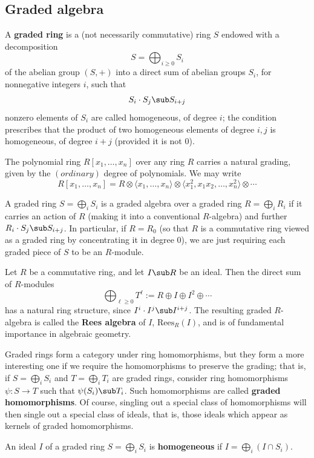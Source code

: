 \subsection{Graded algebra}
A \textbf{graded ring} is a (not necessarily commutative) ring $S$ endowed with a decomposition
\[S=\bigoplus_{i\geq 0}S_i\]
of the abelian group $(S,+)$ into a direct sum of abelian groups $S_i$, for nonnegative integers $i$, such that
\[S_i\cdot S_j\sub S_{i+j}\]
nonzero elements of $S_i$ are called homogeneous, of degree $i$; the condition prescribes that the product of two homogeneous elements of degree $i,j$ is homogeneous, of degree $i+j$ (provided it is not $0$).
\begin{example}
The polynomial ring $R[x_1,\dots,x_n]$ over any ring $R$ carries a natural grading, given by the $(ordinary)$ degree of polynomials. We may write
\[R[x_1,\dots,x_n]=R\otimes\langle x_1,\dots,x_n\rangle\otimes\langle x_1^2,x_1x_2,\dots,x_n^2\rangle\otimes\cdots\]
\end{example}
A graded ring $S=\bigoplus_iS_i$ is a graded algebra over a graded ring $R=\bigoplus_iR_i$ if it carries an action of $R$ (making it into a conventional $R$-algebra) and further $R_i\cdot S_j\sub S_{i+j}$. In particular, if $R=R_0$ (so that $R$ is a commutative ring viewed as a graded ring by concentrating it in degree $0$), we are just requiring each graded piece of $S$ to be an $R$-module. 
\begin{example}
Let $R$ be a commutative ring, and let $I\sub R$ be an ideal. Then the direct sum of $R$-modules
\[\bigoplus_{\ell\geq0}T^{\ell}:=R\oplus I\oplus I^2\oplus\cdots\]
has a natural ring structure, since $I^i\cdot I^j\sub I^{i+j}$. The resulting graded $R$-algebra is
called the \textbf{Rees algebra} of $I$, $\mathrm{Rees}_R(I)$, and is of fundamental importance in algebraic geometry.
\end{example}
Graded rings form a category under ring homomorphisms, but they form a more interesting one if we require the homomorphisms to preserve the grading; that is, if $S=\bigoplus_iS_i$ and $T=\bigoplus_iT_i$ are graded rings, consider ring homomorphisms $\psi:S\to T$ such that $\psi(S_i)\sub T_i$. Such homomorphisms are called \textbf{graded homomorphisms}. Of course, singling out a special class of homomorphisms will then single out a special class of ideals, that is, those ideals which appear as kernels of graded homomorphisms.
\begin{definition}
An ideal $I$ of a graded ring $S=\bigoplus_iS_i$ is \textbf{homogeneous} if $I=\bigoplus_i(I\cap S_i)$.
\end{definition}
